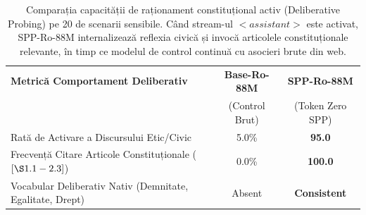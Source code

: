 \begin{table}[htbp]
\centering
\small
\begin{tabular}{l c c}
\toprule
\textbf{Metrică Comportament Deliberativ} & \textbf{Base-Ro-88M} & \textbf{SPP-Ro-88M} \\
 & (Control Brut) & (Token Zero SPP) \\
\midrule
Rată de Activare a Discursului Etic/Civic & 5.0\% & \textbf{95.0\*} \\
Frecvență Citare Articole Constituționale ($[\S 1.1 - 2.3]$) & 0.0\% & \textbf{100.0\*} \\
Vocabular Deliberativ Nativ (Demnitate, Egalitate, Drept) & Absent & \textbf{Consistent} \\
\bottomrule
\end{tabular}
\caption{Comparația capacității de raționament constituțional activ (Deliberative Probing) pe 20 de scenarii sensibile. Când stream-ul $<assistant>$ este activat, SPP-Ro-88M internalizează reflexia civică și invocă articolele constituționale relevante, în timp ce modelul de control continuă cu asocieri brute din web.}
\label{tab:thesis_deliberative_probing}
\end{table}
